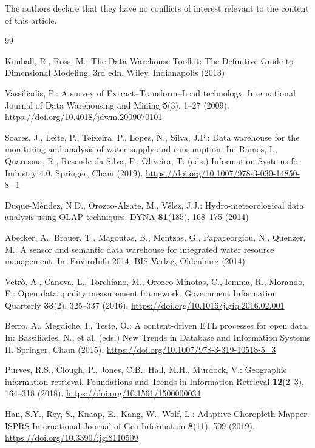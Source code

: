 \documentclass[runningheads]{llncs}
\renewcommand{\_}{\origunderscore\allowbreak}
\begin{document}
The authors declare that they have no conflicts of interest relevant to the
content of this article.

\begin{thebibliography}{99}

 Kimball, R., Ross, M.: The Data Warehouse Toolkit: The Definitive Guide to Dimensional Modeling. 3rd edn. Wiley, Indianapolis (2013)

 Vassiliadis, P.: A survey of Extract--Transform--Load technology. International Journal of Data Warehousing and Mining \textbf{5}(3), 1--27 (2009). \url{https://doi.org/10.4018/jdwm.2009070101}

 Soares, J., Leite, P., Teixeira, P., Lopes, N., Silva, J.P.: Data warehouse for the monitoring and analysis of water supply and consumption. In: Ramos, I., Quaresma, R., Resende da Silva, P., Oliveira, T. (eds.) Information Systems for Industry 4.0. Springer, Cham (2019). \url{https://doi.org/10.1007/978-3-030-14850-8_1}

 Duque-M\'endez, N.D., Orozco-Alzate, M., V\'elez, J.J.: Hydro-meteorological data analysis using OLAP techniques. DYNA \textbf{81}(185), 168--175 (2014)

 Abecker, A., Brauer, T., Magoutas, B., Mentzas, G., Papageorgiou, N., Quenzer, M.: A sensor and semantic data warehouse for integrated water resource management. In: EnviroInfo 2014. BIS-Verlag, Oldenburg (2014)

 Vetr\`o, A., Canova, L., Torchiano, M., Orozco Minotas, C., Iemma, R., Morando, F.: Open data quality measurement framework. Government Information Quarterly \textbf{33}(2), 325--337 (2016). \url{https://doi.org/10.1016/j.giq.2016.02.001}

 Berro, A., Megdiche, I., Teste, O.: A content-driven ETL processes for open data. In: Bassiliades, N., et al. (eds.) New Trends in Database and Information Systems II. Springer, Cham (2015). \url{https://doi.org/10.1007/978-3-319-10518-5_3}

 Purves, R.S., Clough, P., Jones, C.B., Hall, M.H., Murdock, V.: Geographic information retrieval. Foundations and Trends in Information Retrieval \textbf{12}(2--3), 164--318 (2018). \url{https://doi.org/10.1561/1500000034}

 Han, S.Y., Rey, S., Knaap, E., Kang, W., Wolf, L.: Adaptive Choropleth Mapper. ISPRS International Journal of Geo-Information \textbf{8}(11), 509 (2019). \url{https://doi.org/10.3390/ijgi8110509}


\end{thebibliography}
\end{document}
